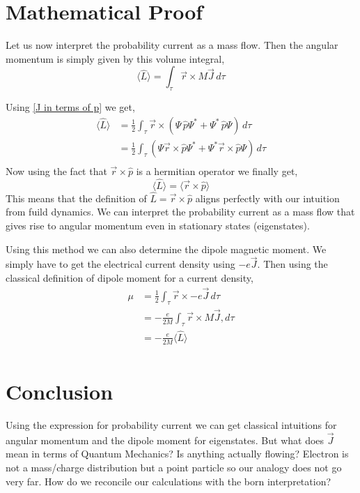 \documentclass[a4paper, 12pt]{article}
\renewcommand{\indent}{\hspace{3ex}}
\begin{document}
\section{Mathematical Proof}
\indent Let us now interpret the probability current as a mass flow. Then the angular momentum is simply given by this volume integral,
\begin{equation}
	\langle \hat L \rangle = \int_\tau \vec r \times M \vec J \, d\tau
\end{equation}

Using \eqref{J in terms of p} we get,
\begin{align*}
	\langle \hat L \rangle &= \frac{1}{2} \int_\tau \vec r \times \left( \Psi \, \hat p \Psi^* + \Psi^* \, \hat p \Psi \right) \, d\tau \\
						   &= \frac{1}{2} \int_\tau \left( \Psi \vec r \times \hat p \Psi^* + \Psi^* \vec r \times \hat p \Psi \right) \, d\tau \\
\end{align*}
Now using the fact that $\vec r \times \hat p$ is a hermitian operator we finally get,
\[ \langle \hat L \rangle = \langle \vec r \times \hat p \rangle \]
This means that the definition of $\hat L = \vec r \times \hat p$ aligns perfectly with our intuition from fuild dynamics. We can interpret the probability current as a mass flow that gives rise to angular momentum even in stationary states (eigenstates).

\indent Using this method we can also determine the dipole magnetic moment. We simply have to get the electrical current density using $-e \vec J$. Then using the classical definition of dipole moment for a current density,
\begin{align*}
	\mu &= \frac{1} {2} \int_\tau \vec r \times -e \vec J \, d\tau \\
		&= - \frac{e}{2M} \int_\tau \vec r \times M \vec J , d\tau \\
		&= - \frac{e}{2M} \langle \hat L \rangle \\
\end{align*}

\section{Conclusion}
\indent Using the expression for probability current we can get classical intuitions for angular momentum and the dipole moment for eigenstates. But what does $\vec J$ mean in terms of Quantum Mechanics? Is anything actually flowing? Electron is not a mass/charge distribution but a point particle so our analogy does not go very far. How do we reconcile our calculations with the born interpretation?
\end{document}
